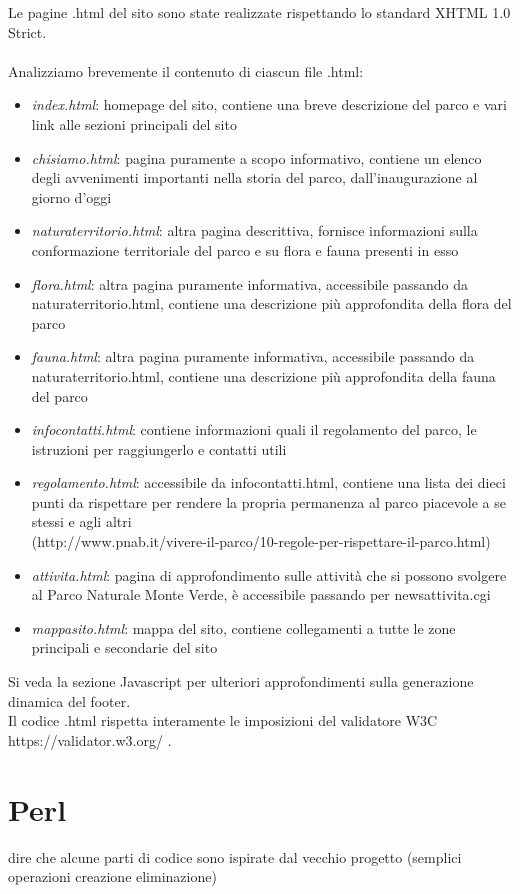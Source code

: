 \documentclass[12pt]{article}
\begin{document}
Le pagine .html del sito sono state realizzate rispettando lo standard XHTML 1.0 Strict.\\ \\
Analizziamo brevemente il contenuto di ciascun file .html:
\begin{itemize}
\item \textit{index.html}: homepage del sito, contiene una breve descrizione del parco e vari link alle sezioni principali del sito
\item \textit{chisiamo.html}:  pagina puramente a scopo informativo, contiene un elenco degli avvenimenti importanti nella storia del parco, dall'inaugurazione al giorno d'oggi
\item \textit{naturaterritorio.html}:  altra pagina descrittiva, fornisce informazioni sulla conformazione territoriale del parco e su flora e fauna presenti in esso
\item \textit{flora.html}: altra pagina puramente informativa, accessibile passando da naturaterritorio.html, contiene una descrizione più approfondita della flora del parco
\item \textit{fauna.html}: altra pagina puramente informativa, accessibile passando da naturaterritorio.html, contiene una descrizione più approfondita della fauna del parco
\item \textit{infocontatti.html}: contiene informazioni quali il regolamento del parco, le istruzioni per raggiungerlo e contatti utili
\item \textit{regolamento.html}: accessibile da infocontatti.html, contiene una lista dei dieci punti da rispettare per rendere la propria permanenza al parco piacevole a se stessi e agli altri\\ (http://www.pnab.it/vivere-il-parco/10-regole-per-rispettare-il-parco.html)
\item \textit{attivita.html}: pagina di approfondimento sulle attività che si possono svolgere al Parco Naturale Monte Verde, è accessibile passando per newsattivita.cgi
\item \textit{mappasito.html}: mappa del sito, contiene collegamenti a tutte le zone principali e secondarie del sito
\end{itemize}
Si veda la sezione Javascript per ulteriori approfondimenti sulla generazione dinamica del footer.\\
Il codice .html rispetta interamente le imposizioni del validatore W3C \\https://validator.w3.org/ .


			\section{Perl} dire che alcune parti di codice sono ispirate dal vecchio progetto (semplici operazioni creazione eliminazione)
		
\end{document}
